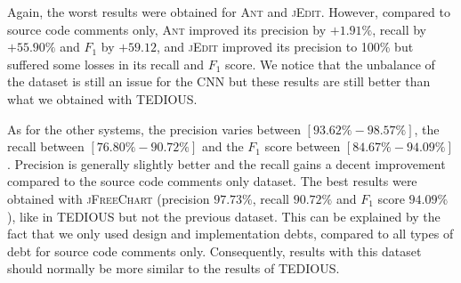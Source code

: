 \begin{table}[t]
	\caption{Within-project prediction: results of CNN for each system using source code with comments}
	\label{tab:comments}
	\centering\tiny
	\vspace{-3mm}
\end{table}

Again, the worst results were obtained for \textsc{Ant} and \textsc{jEdit}. However, compared to source code comments only, \textsc{Ant} improved its precision by $+ 1.91\%$, recall by $+ 55.90\%$ and $F_1$ by $+ 59.12$, and \textsc{jEdit} improved its precision to 100\% but suffered some losses in its recall and $F_1$ score. We notice that the unbalance of the dataset is still an issue for the CNN but these results are still better than what we obtained with TEDIOUS.

As for the other systems, the precision varies between $[93.62\%-98.57\%]$, the recall between $[76.80\%-90.72\%]$ and the $F_1$ score between $[84.67\%-94.09\%]$. Precision is generally slightly better and the recall gains a decent improvement compared to the source code comments only dataset. The best results were obtained with \textsc{jFreeChart} (precision $97.73\%$, recall $90.72\%$ and $F_1$ score $94.09\%$), like in TEDIOUS but not the previous dataset. This can be explained by the fact that we only used design and implementation debts, compared to all types of debt for source code comments only. Consequently, results with this dataset should normally be more similar to the results of TEDIOUS.

